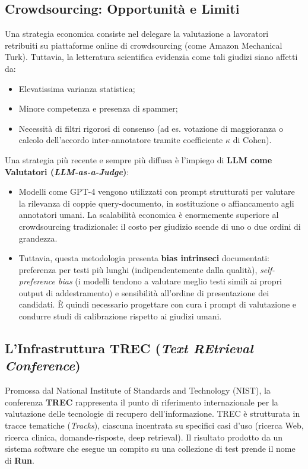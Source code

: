 \subsection{Crowdsourcing: Opportunità e Limiti}
Una strategia economica consiste nel delegare la valutazione a lavoratori retribuiti su piattaforme online di crowdsourcing (come Amazon Mechanical Turk). Tuttavia, la letteratura scientifica evidenzia come tali giudizi siano affetti da:
\begin{itemize}
    \item Elevatissima varianza statistica;
    \item Minore competenza e presenza di spammer;
    \item Necessità di filtri rigorosi di consenso (ad es. votazione di maggioranza o calcolo dell'accordo inter-annotatore tramite coefficiente $\kappa$ di Cohen).
\end{itemize}

Una strategia più recente e sempre più diffusa è l'impiego di \textbf{LLM come Valutatori (\textit{LLM-as-a-Judge})}:
\begin{itemize}
    \item Modelli come GPT-4 vengono utilizzati con prompt strutturati per valutare la rilevanza di coppie query-documento, in sostituzione o affiancamento agli annotatori umani. La scalabilità economica è enormemente superiore al crowdsourcing tradizionale: il costo per giudizio scende di uno o due ordini di grandezza.
    \item Tuttavia, questa metodologia presenta \textbf{bias intrinseci} documentati: preferenza per testi più lunghi (indipendentemente dalla qualità), \textit{self-preference bias} (i modelli tendono a valutare meglio testi simili ai propri output di addestramento) e sensibilità all'ordine di presentazione dei candidati. È quindi necessario progettare con cura i prompt di valutazione e condurre studi di calibrazione rispetto ai giudizi umani.
\end{itemize}

\subsection{L'Infrastruttura TREC (\textit{Text REtrieval Conference})}
Promossa dal National Institute of Standards and Technology (NIST), la conferenza \textbf{TREC} rappresenta il punto di riferimento internazionale per la valutazione delle tecnologie di recupero dell'informazione.
TREC è strutturata in tracce tematiche (\textit{Tracks}), ciascuna incentrata su specifici casi d'uso (ricerca Web, ricerca clinica, domande-risposte, deep retrieval).
Il risultato prodotto da un sistema software che esegue un compito su una collezione di test prende il nome di \textbf{Run}.

